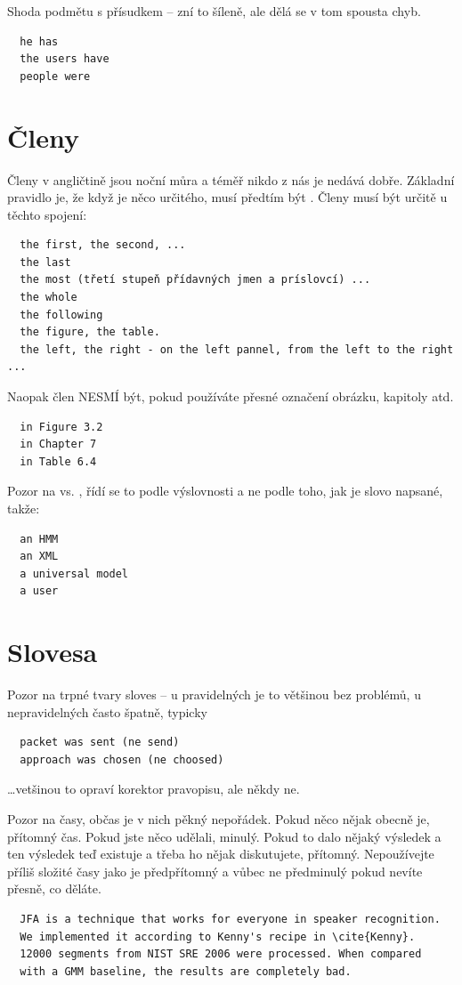 \noindent Shoda podmětu s přísudkem -- zní to šíleně, ale dělá se v tom spousta chyb. 

\begin{verbatim}
  he has 
  the users have 
  people were 
\end{verbatim}

\section{Členy}

Členy v angličtině jsou noční můra a téměř nikdo z nás je nedává dobře. Základní pravidlo je, že když je něco určitého, musí předtím být . Členy musí být určitě u těchto spojení:
\begin{verbatim}
  the first, the second, ...
  the last
  the most (třetí stupeň přídavných jmen a príslovcí) ...
  the whole 
  the following 
  the figure, the table. 
  the left, the right - on the left pannel, from the left to the right ... 
\end{verbatim}

\noindent Naopak člen NESMÍ být, pokud používáte přesné označení obrázku, kapitoly atd.
\begin{verbatim}
  in Figure 3.2
  in Chapter 7
  in Table 6.4
\end{verbatim}

\begin{samepage}
\noindent Pozor na  vs. , řídí se to podle výslovnosti a ne podle toho, jak je slovo napsané, takže:
\begin{verbatim}
  an HMM
  an XML
  a universal model
  a user
\end{verbatim}
\end{samepage}

\section{Slovesa}

Pozor na trpné tvary sloves -- u pravidelných je to většinou bez problémů, u nepravidelných často špatně, typicky
\begin{verbatim}
  packet was sent (ne send)
  approach was chosen (ne choosed)
\end{verbatim}
\noindent \ldots vetšinou to opraví korektor pravopisu, ale někdy ne. 

Pozor na časy, občas je v nich pěkný nepořádek. Pokud něco nějak obecně je, přítomný čas. Pokud jste něco udělali, minulý. Pokud to dalo nějaký výsledek a ten výsledek teď existuje a třeba ho nějak diskutujete, přítomný. Nepoužívejte příliš složité časy jako je předpřítomný a vůbec ne předminulý pokud nevíte přesně, co děláte.
\begin{verbatim}
  JFA is a technique that works for everyone in speaker recognition. 
  We implemented it according to Kenny's recipe in \cite{Kenny}. 
  12000 segments from NIST SRE 2006 were processed. When compared 
  with a GMM baseline, the results are completely bad. 
\end{verbatim}

